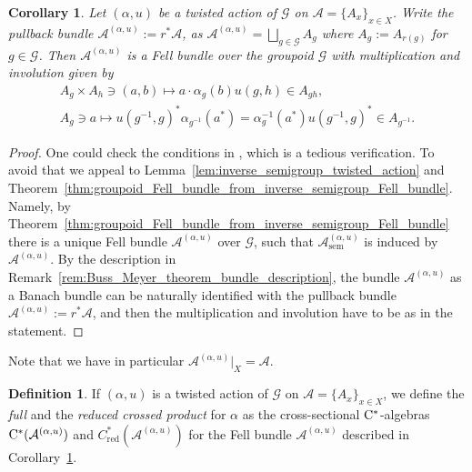 \documentclass[11 pt, leqno]{amsart}
\numberwithin{equation}{section}
\theoremstyle{plain}
\newtheorem{cor}[thm]{Corollary}
\theoremstyle{definition}
\newtheorem {defn}[thm] {Definition}
\newcommand*{\cstar}{\texorpdfstring{\(\Cst\)\nobreakdash-\hspace{0pt}}{*-}}
\newcommand*{\Cst}{\mathrm \cst}%
\DeclareMathOperator{\red}{red}%
\DeclareMathOperator{\sem}{sem}
\newcommand{\G}{\mathcal G} %
\newcommand{\A}{\mathcal A}
\newcommand{\cst}{\ifmmode\mathrm{C}^*\else{$\mathrm{C}^*$}\fi}
\begin{document}
\begin{cor}\label{cor:Fell_bundle_from_twisted_action} 
Let $(\alpha, u)$ be a twisted action of $\G$ on $\A = \{A_x\}_{x\in X}$. 
Write the pullback bundle $\A^{(\alpha, u)} := r^{*}\A$, as $\A^{(\alpha, u)} = \bigsqcup_{ g\in \G } A_g$ where $A_g:= A_{r(g)}$ for $g\in \G$. 
Then $\A^{(\alpha, u)}$ is a Fell bundle over the groupoid $\G$ with multiplication and involution given by  
\begin{gather*}
    A_g\times A_h \ni (a,b) \longmapsto a\cdot \alpha_g(b)u(g,h)\in  A_{gh}, \\
    A_g \ni a\longmapsto u(g^{-1},g)^*\alpha_{g^{-1}}(a^*)=\alpha_{g}^{-1}(a^*)u(g^{-1},g)^*\in A_{g^{-1}}.
\end{gather*}
\end{cor}
\begin{proof} 
One could check the conditions in \cite[Definition 2.6]{BussExel}, which is a tedious verification. 	
To avoid that we  appeal to Lemma~\ref{lem:inverse_semigroup_twisted_action} and Theorem~\ref{thm:groupoid_Fell_bundle_from_inverse_semigroup_Fell_bundle}. %
Namely, by Theorem~\ref{thm:groupoid_Fell_bundle_from_inverse_semigroup_Fell_bundle} there is  a unique Fell bundle $\A^{(\alpha,u)}$ over $\G$, such that $\A_{\sem}^{(\alpha,u)}$ is induced by  $\A^{(\alpha,u)}$.
By the description in Remark~\ref{rem:Buss_Meyer_theorem_bundle_description}, the bundle $\A^{(\alpha,u)}$ as a Banach bundle can be naturally identified with the pullback bundle $\A^{(\alpha, u)}:=r^{*}\A$, and then the multiplication and involution have to be as in the statement.
\end{proof}

Note that we have in particular $\A^{(\alpha, u)}|_X=\A$.

\begin{defn}\label{def:Groupoid_action_and_related_objects}
If $(\alpha, u)$ is a twisted action of $\G$ on $\A = \{ A_x \}_{x\in X}$, we define the \emph{full} and the \emph{reduced crossed product} for $\alpha$ as the cross-sectional \cstar{}algebras $\cst(\A^{(\alpha,u)})$ and $C_{\red}^*(\A^{(\alpha,u)})$ for the Fell bundle $\A^{(\alpha,u)}$ described in Corollary~\ref{cor:Fell_bundle_from_twisted_action}.	
\end{defn}
\end{document}
